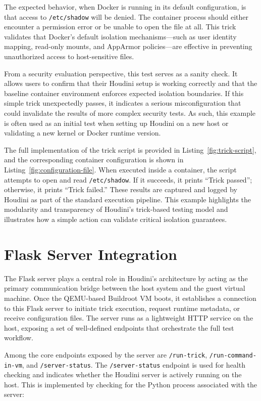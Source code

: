 \documentclass[12pt]{report}
\begin{document}
\begin{doublespace}
The expected behavior, when Docker is running in its default configuration, is that access to \texttt{/etc/shadow} will be denied. The container process should either encounter a permission error or be unable to open the file at all. This trick validates that Docker’s default isolation mechanisms—such as user identity mapping, read-only mounts, and AppArmor policies—are effective in preventing unauthorized access to host-sensitive files.

From a security evaluation perspective, this test serves as a sanity check. It allows users to confirm that their Houdini setup is working correctly and that the baseline container environment enforces expected isolation boundaries. If this simple trick unexpectedly passes, it indicates a serious misconfiguration that could invalidate the results of more complex security tests. As such, this example is often used as an initial test when setting up Houdini on a new host or validating a new kernel or Docker runtime version.

The full implementation of the trick script is provided in Listing~\ref{fig:trick-script}, and the corresponding container configuration is shown in Listing~\ref{fig:configuration-file}. When executed inside a container, the script attempts to open and read \texttt{/etc/shadow}. If it succeeds, it prints “Trick passed”; otherwise, it prints “Trick failed.” These results are captured and logged by Houdini as part of the standard execution pipeline. This example highlights the modularity and transparency of Houdini’s trick-based testing model and illustrates how a simple action can validate critical isolation guarantees.


\section{Flask Server Integration}

The Flask server plays a central role in Houdini’s architecture by acting as the primary communication bridge between the host system and the guest virtual machine. Once the QEMU-based Buildroot VM boots, it establishes a connection to this Flask server to initiate trick execution, request runtime metadata, or receive configuration files. The server runs as a lightweight HTTP service on the host, exposing a set of well-defined endpoints that orchestrate the full test workflow.

Among the core endpoints exposed by the server are \texttt{/run-trick}, \texttt{/run-command-in-vm}, and \texttt{/server-status}. The \texttt{/server-status} endpoint is used for health checking and indicates whether the Houdini server is actively running on the host. This is implemented by checking for the Python process associated with the server:


\end{doublespace}
\end{document}
